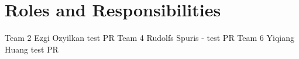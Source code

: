 \chapter{Roles and Responsibilities}


Team 2 Ezgi Ozyilkan test PR
Team 4 Rudolfs Spuris - test PR
Team 6 Yiqiang Huang test PR
